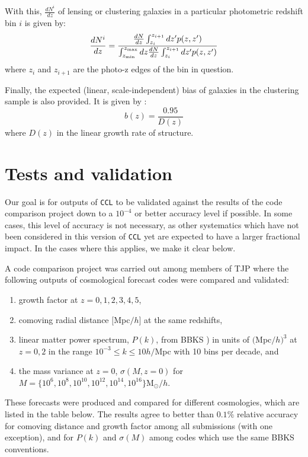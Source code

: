\documentclass[\docopts]{\docclass}
\begin{document}
With this, $\frac{dN^i}{dz}$ of lensing or clustering galaxies in a particular photometric redshift bin $i$ is given by:
\begin{equation}
\frac{dN^i}{dz} = \frac{\frac{dN}{dz}\int_{z_i}^{z_{i+1}} dz' p(z,z')}{\int_{z_{\rm min}}^{z_{\rm max}}dz \frac{dN}{dz} \int_{z_i}^{z_{i+1}}dz' p(z, z')}
\label{photoz}
\end{equation}
where $z_{i}$ and $z_{i+1}$ are the photo-z edges of the bin in question.

Finally, the expected (linear, scale-independent) bias of galaxies in the clustering sample is also provided. It is given by \cite{ScienceBook}:
\begin{equation}
b(z) = \frac{0.95}{D(z)}
\label{clustbias}
\end{equation}
where $D(z)$ in the linear growth rate of structure.

\section{Tests and validation}
\label{sec:tests}

Our goal is for outputs of {\tt CCL} to be validated against the results of the code comparison project down to a $10^{-4}$ or better accuracy level if possible. In some cases, this level of accuracy is not necessary, as other systematics which have not been considered in this version of {\tt CCL} yet are expected to have a larger fractional impact. In the cases where this applies, we make it clear below.

A code comparison project was carried out among members of TJP where the following outputs of cosmological forecast codes were compared and validated:
\begin{enumerate}
\item growth factor at $z = 0,1,2,3,4,5$,
\item comoving radial distance $[$Mpc$/h]$ at the same redshifts,
\item linear matter power spectrum, $P(k)$, from BBKS \citealt{BBKS}) in units of $($Mpc$/h)^3$ at $z=0,2$ in the range $10^{-3} \leq k \leq 10 h/$Mpc with 10 bins per decade, and
\item the mass variance at $z=0$, $\sigma(M,z=0)$ for $M =\{10^6, 10^8, 10^{10}, 10^{12}, 10^{14}, 10^{16}\} $M$_\odot/h$.
\end{enumerate}
These forecasts were produced and compared for different cosmologies, which are listed in the table below. The results agree to better than $0.1\%$ relative accuracy for comoving distance and growth factor among all submissions (with one exception), and for $P(k)$ and $\sigma(M)$ among codes which use the same BBKS conventions.
\end{document}
